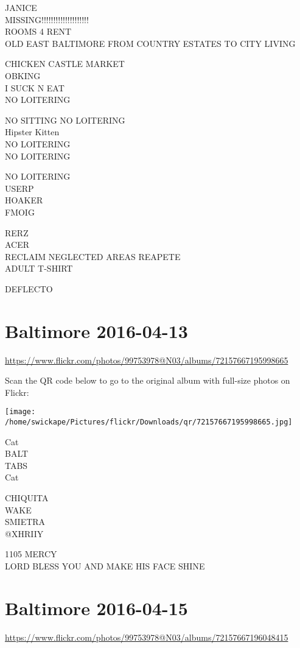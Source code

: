 \documentclass[10pt,letterpaper]{article}
\begin{document}
JANICE\\
MISSING!!!!!!!!!!!!!!!!!!!!\\
ROOMS 4 RENT\\
OLD EAST BALTIMORE FROM COUNTRY ESTATES TO CITY LIVING

CHICKEN CASTLE MARKET\\
OBKING\\
I SUCK N EAT\\
NO LOITERING

NO SITTING NO LOITERING\\
Hipster Kitten\\
NO LOITERING\\
NO LOITERING

NO LOITERING\\
USERP\\
HOAKER\\
FMOIG

RERZ\\
ACER\\
RECLAIM NEGLECTED AREAS REAPETE\\
ADULT T{-}SHIRT

DEFLECTO


\section*{Baltimore 2016-04-13}

\url{https://www.flickr.com/photos/99753978@N03/albums/72157667195998665}

Scan the QR code below to go to the original album with full-size photos on Flickr:

\texttt{[image: /home/swickape/Pictures/flickr/Downloads/qr/72157667195998665.jpg]}


Cat\\
BALT\\
TABS\\
Cat

CHIQUITA\\
WAKE\\
SMIETRA\\
@XHRIIY

1105 MERCY\\
LORD BLESS YOU AND MAKE HIS FACE SHINE


\section*{Baltimore 2016-04-15}

\url{https://www.flickr.com/photos/99753978@N03/albums/72157667196048415}
\end{document}
